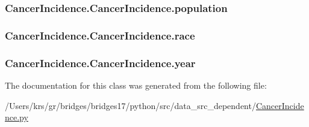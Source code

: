 \subsubsection[{population}]{\setlength{\rightskip}{0pt plus 5cm}Cancer\+Incidence.\+Cancer\+Incidence.\+population}\label{class_cancer_incidence_1_1_cancer_incidence_ac89ae8d4a5a136f71dc339d4af256904}
\hypertarget{class_cancer_incidence_1_1_cancer_incidence_aabf2d41cf0000d41fb135b2801b35334}{}
\subsubsection[{race}]{\setlength{\rightskip}{0pt plus 5cm}Cancer\+Incidence.\+Cancer\+Incidence.\+race}\label{class_cancer_incidence_1_1_cancer_incidence_aabf2d41cf0000d41fb135b2801b35334}
\hypertarget{class_cancer_incidence_1_1_cancer_incidence_ad3ebc04a77307ff150f2d6f0f95b3de7}{}
\subsubsection[{year}]{\setlength{\rightskip}{0pt plus 5cm}Cancer\+Incidence.\+Cancer\+Incidence.\+year}\label{class_cancer_incidence_1_1_cancer_incidence_ad3ebc04a77307ff150f2d6f0f95b3de7}


The documentation for this class was generated from the following file\+:\begin{DoxyCompactItemize}
\item 
/\+Users/krs/gr/bridges/bridges17/python/src/data\+\_\+src\+\_\+dependent/\hyperlink{_cancer_incidence_8py}{Cancer\+Incidence.\+py}\end{DoxyCompactItemize}
